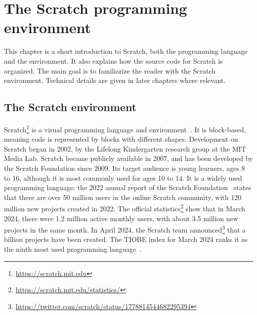 \documentclass[../main]{subfiles}
\begin{document}
\chapter{The Scratch programming environment}\label{ch:scratch-the-programming-environment}


This chapter is a short introduction to Scratch, both the programming language and the environment.
It also explains how the source code for Scratch is organized.
The main goal is to familiarize the reader with the Scratch environment.
Technical details are given in later chapters where relevant.

\section{The Scratch environment}\label{sec:scratch-environment}


Scratch\footnote{\url{https://scratch.mit.edu}} is a visual programming language and environment~\autocite{resnickScratchProgrammingAll2009}.
It is block-based, meaning code is represented by blocks with different shapes.
Development on Scratch began in 2002, by the Lifelong Kindergarten research group at the MIT Media Lab.
Scratch became publicly available in 2007, and has been developed by the Scratch Foundation since 2009.
Its target audience is young learners, ages 8 to 16, although it is most commonly used for ages 10 to 14.
It is a widely used programming language: the 2022 annual report of the Scratch Foundation~\autocite{scratchfoundationGrowingGlobalCreative2022} states that there are over 50 million users in the online Scratch community, with 120 million new projects created in 2022.
The official statistics\footnote{\url{https://scratch.mit.edu/statistics/}} show that in March 2024, there were 1.2 million active monthly users, with about 3.5 million new projects in the same month.
In April 2024, the Scratch team announced\footnote{\url{https://twitter.com/scratch/status/1778814544682295394}} that a billion projects have been created.
The TIOBE index for March 2024 ranks it as the ninth most used programming language~\autocite{tiobeTIOBEIndexMarch2024}.
\end{document}
